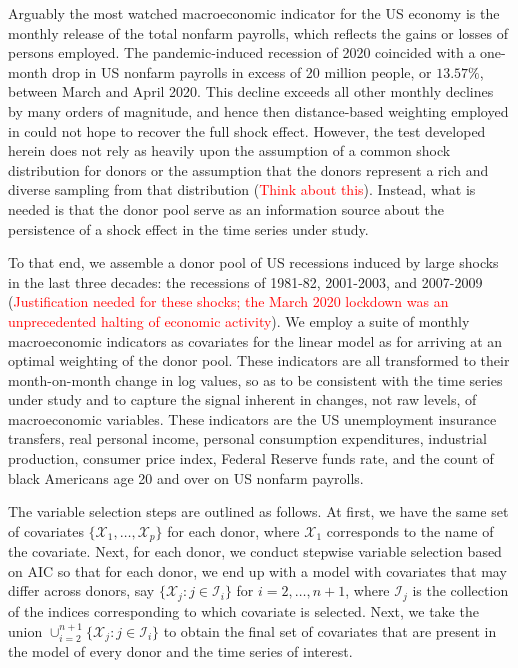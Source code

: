 \documentclass[11pt]{article}
\def\mc#1{\mathcal{#1}} %
\def\mc#1{\mathcal{#1}}
\theoremstyle{definition}
\begin{document}
Arguably the most watched macroeconomic indicator for the US economy is the monthly release of the total nonfarm payrolls, which reflects the gains or losses of persons employed. The pandemic-induced recession of 2020 coincided with a one-month drop in US nonfarm payrolls in excess of 20 million people, or $13.57\%$, between March and April 2020.  This decline exceeds all other monthly declines by many orders of magnitude, and hence then distance-based weighting employed in \citep{lin2021minimizing} could not hope to recover the full shock effect.  However, the test developed herein does not rely as heavily upon the assumption of a common shock distribution for donors or the assumption that the donors represent a rich and diverse sampling from that distribution (\textcolor{red}{Think about this}).  Instead, what is needed is that the donor pool serve as an information source about the persistence of a shock effect in the time series under study.  

To that end, we assemble a donor pool of US recessions induced by large shocks in the last three decades: the recessions of 1981-82, 2001-2003, and 2007-2009 (\textcolor{red}{Justification needed for these shocks; the March 2020 lockdown was an unprecedented halting of economic activity}).  We employ a suite of monthly macroeconomic indicators as covariates for the linear model as for arriving at an optimal weighting of the donor pool.  These indicators are all transformed to their month-on-month change in log values, so as to be consistent with the time series under study and to capture the signal inherent in changes, not raw levels, of macroeconomic variables.  These indicators are the US unemployment insurance transfers, real personal income, personal consumption expenditures, industrial production, consumer price index, Federal Reserve funds rate, and the count of black Americans age 20 and over on US nonfarm payrolls.


The variable selection steps are outlined as follows. At first, we have the same set of covariates $\{\mc{X}_1, \ldots, \mc{X}_p\}$ for each donor, where $\mc{X}_1$ corresponds to the name of the covariate. Next, for each donor, we conduct stepwise variable selection based on AIC so that for each donor, we end up with a model with covariates that may differ across  donors, say $\{\mc{X}_j \colon j\in \mc{I}_i\}$ for $i = 2, \ldots, n+1$, where $\mc{I}_j$ is the collection of the indices corresponding to which covariate is selected. Next, we  take the union $\cup_{i=2}^{n+1}\{\mc{X}_j \colon j\in \mc{I}_i\}$ to obtain the final set of covariates that are present in the model of every donor and the time series of interest.
\end{document}
